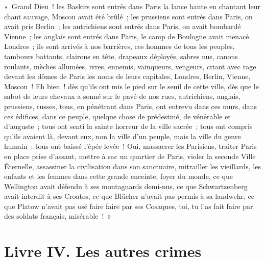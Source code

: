 \documentclass[french,twoside]{book} %
\begin{document}
« Grand Dieu ! les Baskirs sont entrés dans Paris la lance haute en chantant leur chant sauvage, Moscou avait été brûlé ; les prussiens sont entrés dans Paris, on avait pris Berlin ; les autrichiens sont entrés dans Paris, on avait bombardé Vienne ; les anglais sont entrés dans Paris, le camp de Boulogne avait menacé Londres ; ils sont arrivés à nos barrières, ces hommes de tous les peuples, tambours battants, clairons en tête, drapeaux déployés, sabres nus, canons roulants, mèches allumées, ivres, ennemis, vainqueurs, vengeurs, criant avec rage devant les dômes de Paris les noms de leurs capitales, Londres, Berlin, Vienne, Moscou ! Eh bien ! dès qu’ils ont mis le pied sur le seuil de cette ville, dès que le sabot de leurs chevaux a sonné sur le pavé de nos rues, autrichiens, anglais, prussiens, russes, tous, en pénétrant dans Paris, ont entrevu dans ces murs, dans ces édifices, dans ce peuple, quelque chose de prédestiné, de vénérable et d’auguste ; tous ont senti la sainte horreur de la ville sacrée ; tous ont compris qu’ils avaient là, devant eux, non la ville d’un peuple, mais la ville du genre humain ; tous ont baissé l’épée levée ! Oui, massacrer les Parisiens, traiter Paris en place prise d’assaut, mettre à sac un quartier de Paris, violer la seconde Ville Éternelle, assassiner la civilisation dans son sanctuaire, mitrailler les vieillards, les enfants et les femmes dans cette grande enceinte, foyer du monde, ce que Wellington avait défendu à ses montagnards demi-nus, ce que Schwartzenberg avait interdit à ses Croates, ce que Blücher n’avait pas permis à sa landwehr, ce que Platow n’avait pas osé faire faire par ses Cosaques, toi, tu l’as fait faire par des soldats français, misérable ! »
\section[{Livre IV. Les autres crimes}]{Livre IV. Les autres crimes}\renewcommand{\leftmark}{Livre IV. Les autres crimes}
\end{document}
